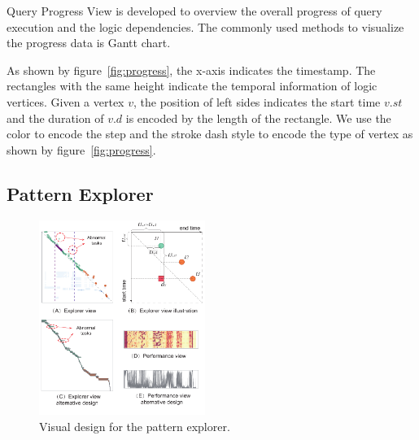 Query Progress View is developed to overview the overall progress of query execution and the logic dependencies. 
The commonly used methods to visualize the progress data is Gantt chart.

As shown by figure~\ref{fig:progress}, the x-axis indicates the timestamp. The rectangles with the same  height indicate the temporal information of logic vertices. Given a vertex $v$, the position of left sides indicates the start time $v.st$ and the duration of $v.d$ is encoded by the length of the rectangle. We use the color to encode the step and the stroke dash style to encode the type of vertex as shown by figure~\ref{fig:progress}.


\subsection{Pattern Explorer}


\begin{figure}[t]
	\centering
	\includegraphics[width=0.48\textwidth]{figures/visualization/patternexplorer.pdf}
	\vspace{-3mm}
	\caption{Visual design for the pattern explorer.}
	\label{fig:explorer}
	\vspace{-3mm}
\end{figure}



